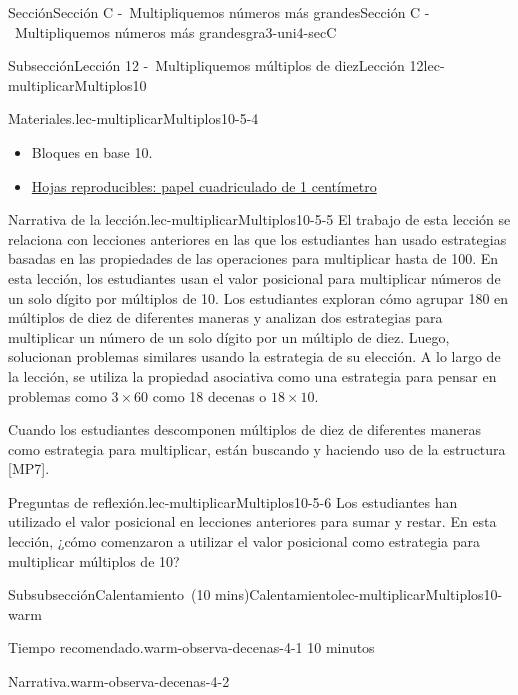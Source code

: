 \documentclass[oneside,10pt,]{article}
\begin{document}
\begin{sectionptx}{Sección}{Sección C -~Multipliquemos números más grandes}{}{Sección C -~Multipliquemos números más grandes}{}{}{gra3-uni4-secC}
\begin{subsectionptx}{Subsección}{Lección 12 -~Multipliquemos múltiplos de diez}{}{Lección 12}{}{}{lec-multiplicarMultiplos10}
\begin{introduction}{}
\begin{paragraphs}{Materiales.}{lec-multiplicarMultiplos10-5-4}
\begin{itemize}[label=\textbullet]
\begin{itemize}[label=$\circ$]
\item{}Bloques en base 10.%
\item{}\hyperref[blm-papelCuadriculadoCentimetro]{Hojas reproducibles: papel cuadriculado de 1 centímetro}%
\end{itemize}
\end{itemize}
\end{paragraphs}%
\begin{paragraphs}{Narrativa de la lección.}{lec-multiplicarMultiplos10-5-5}%
El trabajo de esta lección se relaciona con lecciones anteriores en las que los estudiantes han usado estrategias basadas en las propiedades de las operaciones para multiplicar hasta de 100. En esta lección, los estudiantes usan el valor posicional para multiplicar números de un solo dígito por múltiplos de 10. Los estudiantes exploran cómo agrupar 180 en múltiplos de diez de diferentes maneras y analizan dos estrategias para multiplicar un número de un solo dígito por un múltiplo de diez. Luego, solucionan problemas similares usando la estrategia de su elección. A lo largo de la lección, se utiliza la propiedad asociativa como una estrategia para pensar en problemas como \(3 \times 60\) como 18 decenas o \(18 \times 10\).%
\par
Cuando los estudiantes descomponen múltiplos de diez de diferentes maneras como estrategia para multiplicar, están buscando y haciendo uso de la estructura [MP7].%
\end{paragraphs}%
\begin{paragraphs}{Preguntas de reflexión.}{lec-multiplicarMultiplos10-5-6}%
Los estudiantes han utilizado el valor posicional en lecciones anteriores para sumar y restar. En esta lección, ¿cómo comenzaron a utilizar el valor posicional como estrategia para multiplicar múltiplos de 10?%
\end{paragraphs}%
\end{introduction}%
%
%
\typeout{************************************************}
\typeout{************************************************}
%
\begin{subsubsectionptx}{Subsubsección}{Calentamiento~(10 mins)}{}{Calentamiento}{}{}{lec-multiplicarMultiplos10-warm}
\par
\begin{paragraphs}{Tiempo recomendado.}{warm-observa-decenas-4-1}%
10 minutos%
\end{paragraphs}%
\begin{paragraphs}{Narrativa.}{warm-observa-decenas-4-2}%

\end{paragraphs}
\end{subsubsectionptx}
\end{subsectionptx}
\end{sectionptx}
\end{document}
